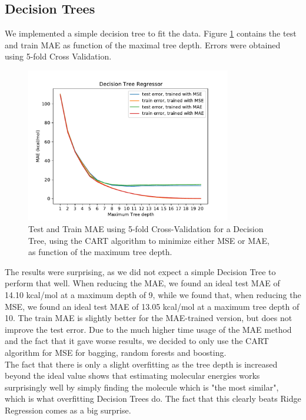 \documentclass[11pt,a4paper,notitlepage]{article}
\begin{document}
\subsection{Decision Trees}
We implemented a simple decision tree to fit the data. Figure \ref{fig:Decisiontree} contains the test and train MAE as function of the maximal tree depth. Errors were obtained using 5-fold Cross Validation.
\begin{figure}[H]
\centering
\includegraphics[width=0.8\textwidth]{decision_tree.pdf}
\caption[Decision Tree]{Test and Train MAE using 5-fold Cross-Validation for a Decision Tree, using the CART algorithm to minimize either MSE or MAE, as function of the maximum tree depth.} \label{fig:Decisiontree}
\end{figure}
The results were surprising, as we did not expect a simple Decision Tree to perform that well. When reducing the MAE, we found an ideal test MAE of 14.10 kcal/mol at a maximum depth of 9, while we found that, when reducing the MSE, we found an ideal test MAE of 13.05 kcal/mol at a maximum tree depth of 10. The train MAE is slightly better for the MAE-trained version, but does not improve the test error. Due to the much higher time usage of the MAE method and the fact that it gave worse results, we decided to only use the CART algorithm for MSE for bagging, random forests and boosting. \\

The fact that there is only a slight overfitting as the tree depth is increased beyond the ideal value shows that estimating molecular energies works surprisingly well by simply finding the molecule which is "the most similar", which is what overfitting Decision Trees do. The fact that this clearly beats Ridge Regression comes as a big surprise. \\
\end{document}
